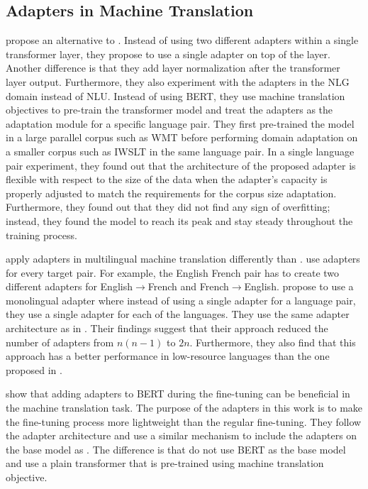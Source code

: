 \subsection{Adapters in Machine Translation}
\label{sec:app_mt}
 propose an alternative to . Instead of using two different adapters within a single transformer layer, they propose to use a single adapter on top of the layer. Another difference is that they add layer normalization after the transformer layer output. Furthermore, they also experiment with the adapters in the NLG domain instead of NLU. Instead of using BERT, they use machine translation objectives to pre-train the transformer model and treat the adapters as the adaptation module for a specific language pair. They first pre-trained the model in a large parallel corpus such as WMT before performing domain adaptation on a smaller corpus such as IWSLT in the same language pair. In a single language pair experiment, they found out that the architecture of the proposed adapter is flexible with respect to the size of the data when the adapter's capacity is properly adjusted to match the requirements for the corpus size adaptation. Furthermore, they found out that they did not find any sign of overfitting; instead, they found the model to reach its peak and stay steady throughout the training process.

 apply adapters in multilingual machine translation differently than .  use adapters for every target pair. For example, the English French pair has to create two different adapters for English$\rightarrow$French and French$\rightarrow$English.  propose to use a monolingual adapter where instead of using a single adapter for a language pair, they use a single adapter for each of the languages. They use the same adapter architecture as in . Their findings suggest that their approach reduced the number of adapters from $n(n-1)$ to $2n$. Furthermore, they also find that this approach has a better performance in low-resource languages than the one proposed in .

 show that adding adapters to BERT during the fine-tuning can be beneficial in the machine translation task. The purpose of the adapters in this work is to make the fine-tuning process more lightweight than the regular fine-tuning. They follow the adapter architecture and use a similar mechanism to include the adapters on the base model as . The difference is that  do not use BERT as the base model and use a plain transformer that is pre-trained using machine translation objective.
